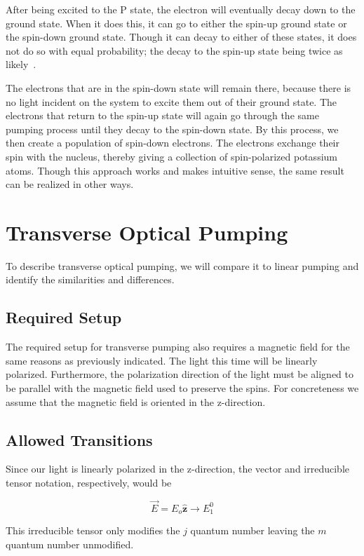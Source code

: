 \documentclass[12pt]{article}
\newcommand{\zhat}{\hat{\textbf{z}}}
\begin{document}
	After being excited to the P state, the electron will 
	eventually decay
	down to the ground state. When it does this, it can go to
	either the spin-up ground state or the spin-down ground
	state. Though it can decay to either of these states, 
	it does not do so with equal probability; the decay to 
	the spin-up state being twice 
	as likely~\cite{swenson}. 

	The electrons that are in the spin-down state will remain
	there, because there is no light incident on the system to 
	excite them out of their ground state. The electrons that 
	return to the spin-up state will again go through the same 
	pumping process until they decay to the spin-down state.
	By this process, we then create a population of spin-down
	electrons. The electrons exchange their spin with 
	the nucleus, thereby giving a collection of spin-polarized
	potassium atoms. Though this approach works and makes 
	intuitive sense, the same result can be realized in other 
	ways.

\section{Transverse Optical Pumping}
To describe transverse optical pumping, we will compare it to 
linear pumping and identify the similarities and differences.
	\subsection{Required Setup}
	The required setup for transverse pumping also requires
	a magnetic field for the same reasons as previously indicated.
	The light this time will be linearly polarized.
	Furthermore, the polarization direction of the light
	must be aligned to be parallel with the magnetic field
	used to preserve the spins. For concreteness we assume
	that the magnetic field is oriented in the z-direction.

	\subsection{Allowed Transitions}
	Since our light is linearly polarized in the z-direction,
	the vector and irreducible tensor notation, respectively, 
	would be

	\begin{equation}
		\vec{E}=E_o \zhat \rightarrow E^{0}_{1}
	\end{equation}

	This irreducible tensor only modifies the $j$ quantum number
	leaving the $m$ quantum number unmodified.
\end{document}
